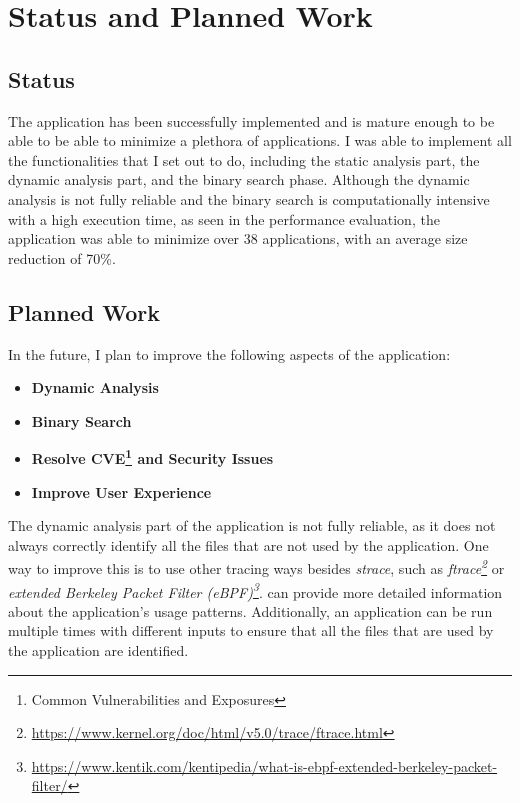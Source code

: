 \chapter{Status and Planned Work}
\label{chapter:status-planned-work}

\section{Status}
\label{sec:status}

The application has been successfully implemented and is mature enough to be able to 
be able to minimize a plethora of applications. I was able to implement all the functionalities that 
I set out to do, including the static analysis part, the dynamic analysis part, and the
binary search phase. Although the dynamic analysis is not fully reliable and the binary search 
is computationally intensive with a high execution time, as seen in the performance evaluation, 
the application was able to minimize over 38 applications, with an average size reduction of 70\%.

\section{Planned Work}
\label{sec:planned-work}

In the future, I plan to improve the following aspects of the application:
\begin{itemize}
    \item \textbf{Dynamic Analysis}
    \item \textbf{Binary Search} 
    \item \textbf{Resolve CVE\footnote[1]{Common Vulnerabilities and Exposures} and Security Issues}
    \item \textbf{Improve User Experience}
\end{itemize}

The dynamic analysis part of the application is not fully reliable, as it does not always correctly identify all the files that are not used by the application.
One way to improve this is to use other tracing ways besides \textit{strace}, such as \textit{ftrace\footnote[2]{\url{https://www.kernel.org/doc/html/v5.0/trace/ftrace.html}}} or  \textit{extended Berkeley Packet Filter (eBPF)\footnote[3]{\url{https://www.kentik.com/kentipedia/what-is-ebpf-extended-berkeley-packet-filter/}}}.
can provide more detailed information about the application's usage patterns.
Additionally, an application can be run multiple times with different inputs to ensure that all the files that are used by the application are identified.

